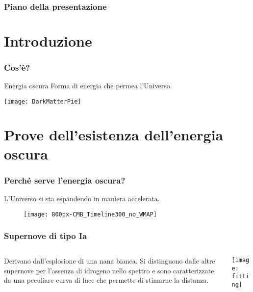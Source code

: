\begin{frame}
  \maketitle
\end{frame}

\begin{frame}
  \frametitle{Piano della presentazione}
  \tableofcontents
\end{frame}

\section{Introduzione}

\begin{frame}
  \frametitle{Cos'è?}
  \begin{block}{Energia oscura}
    Forma di energia che permea l'Universo.
  \end{block}
  \texttt{[image: DarkMatterPie]}
\end{frame}

\section[Prove dell'esistenza]{Prove dell'esistenza dell'energia oscura}

\begin{frame}
  \frametitle{Perché serve l'energia oscura?}
  L'Universo si sta espandendo in maniera \alert{accelerata}.
  \begin{figure}
    \centering
    \texttt{[image: 800px-CMB\_Timeline300\_no\_WMAP]}
  \end{figure}
\end{frame}

\begin{frame}
  \frametitle{Supernove di tipo Ia}
  \begin{columns}
    \begin{column}{0.35\textwidth}
      Derivano dall'esplosione di una nana bianca. Si distinguono dalle altre
      supernove per l'assenza di idrogeno nello spettro e sono caratterizzate da
      una peculiare curva di luce che permette di stimarne la distanza.
    \end{column}
    \begin{column}{0.6\textwidth}
      \texttt{[image: fitting]}
    \end{column}
  \end{columns}
\end{frame}

